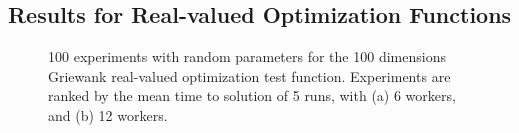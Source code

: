 \documentclass[conference]{IEEEtran}
\begin{document}
\subsection{Results for Real-valued Optimization Functions}
%
\begin{figure}[t]
    \centering

    \caption{100 experiments with random parameters for the 100 dimensions Griewank
    real-valued optimization test function. Experiments are ranked by
    the mean time to solution of 5 runs, with (a) 6 workers, and (b) 12 workers.}
    \label{fig:griewank}
\end{figure}
%
\end{document}
